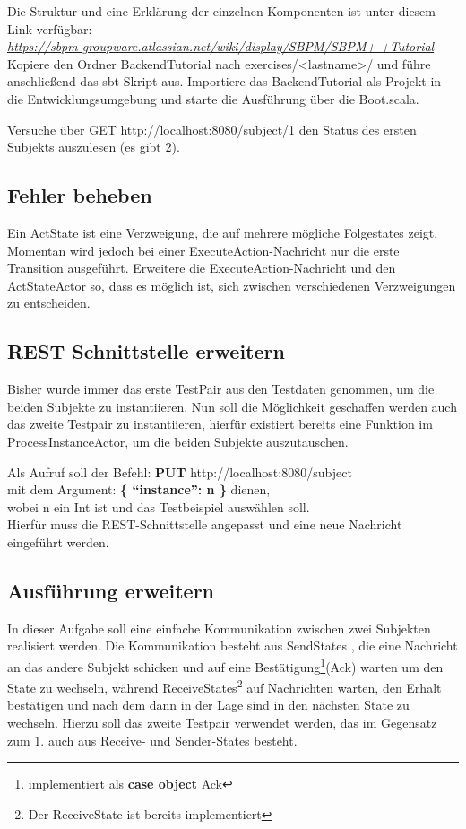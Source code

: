 \documentclass[11pt]{tudexercise}
\newcommand{\link}[1]{\\ \textcolor{blue}{\textit{\url{#1}}}}
\begin{document}
    Die Struktur und eine Erklärung der einzelnen Komponenten ist unter diesem Link verfügbar:
    \link{https://sbpm-groupware.atlassian.net/wiki/display/SBPM/SBPM+-+Tutorial}\\
    Kopiere den Ordner BackendTutorial nach exercises/<lastname>/ und führe anschließend das sbt Skript aus.
    Importiere das BackendTutorial als Projekt in die Entwicklungsumgebung und starte die Ausführung
    über die Boot.scala.

    Versuche über GET http://localhost:8080/subject/1 den Status des ersten Subjekts auszulesen (es gibt 2).

  \subsection{Fehler beheben}
    Ein ActState ist eine Verzweigung, die auf mehrere mögliche Folgestates zeigt. Momentan wird jedoch bei
    einer ExecuteAction-Nachricht nur die erste Transition ausgeführt. Erweitere die ExecuteAction-Nachricht
    und den ActStateActor so, dass es möglich ist, sich zwischen verschiedenen Verzweigungen zu entscheiden.

  \subsection{REST Schnittstelle erweitern}
    Bisher wurde immer das erste TestPair aus den Testdaten genommen, um die beiden Subjekte zu instantiieren.
    Nun soll die Möglichkeit geschaffen werden auch das zweite Testpair zu instantiieren,
    hierfür existiert bereits eine Funktion im ProcessInstanceActor,
    um die beiden Subjekte auszutauschen.

    Als Aufruf soll der Befehl:
    \textbf{PUT} http://localhost:8080/subject\\
    mit dem Argument: \textbf{\{ “instance”: n \}} dienen,\\
    wobei n ein Int ist und das Testbeispiel auswählen soll.\\
    Hierfür muss die REST-Schnittstelle angepasst und eine neue Nachricht eingeführt werden.

  \subsection{Ausführung erweitern}
    In dieser Aufgabe soll eine einfache Kommunikation zwischen zwei Subjekten realisiert werden.
    Die Kommunikation besteht aus SendStates , die eine Nachricht an das andere Subjekt schicken
    und auf eine Bestätigung\footnote{implementiert als \textbf{case object} Ack}(Ack) warten um den State zu wechseln,
    während ReceiveStates\footnote{Der ReceiveState ist bereits implementiert}
    auf Nachrichten warten, den Erhalt bestätigen und nach dem dann in der Lage sind
    in den nächsten State zu wechseln. Hierzu soll das zweite Testpair verwendet werden,
    das im Gegensatz zum 1. auch aus Receive- und Sender-States besteht.
\end{document}
